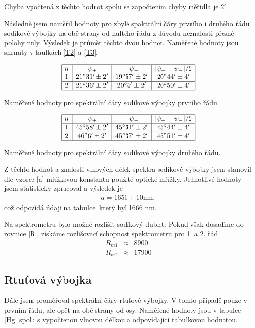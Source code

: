 \documentclass[a4paper,12pt]{article}
\begin{document}
Chyba vpočtená z těchto hodnot spolu se započtením chyby měřidla je $2'$.

Následně jsem naměřil hodnoty pro zbylé spaktrální čáry prvního i druhého řádu sodíkové výbojky na obě strany od nultého řádu z důvodu 
neznalosti přesné polohy nuly. Výsledek je průměr těchto dvou hodnot. Naměřené hodnoty jsou shrnuty v taulkách \ref{T2} a \ref{T3}.

\begin{table}
$$
\begin{array}{|c|c|c|c|}
\hline
n&  \psi_+& -\psi_-& |\psi_+-\psi_-|/2 \\ \hline
1&  21^{\circ} 31'\pm 2'&  19^{\circ} 57'\pm 2'&  20^{\circ} 44'\pm 4' \\ \hline
2&  21^{\circ} 36'\pm 2'& 20^{\circ} 4'\pm 2'& 20^{\circ} 50'\pm 4' \\ \hline
\end{array}
$$
\caption{Naměřené hodnoty pro spektrální čáry sodíkové výbojky prvního řádu.}
\label{T2}
\end{table}

\begin{table}
$$
\begin{array}{|c|c|c|c|}
\hline
n&  \psi_+& -\psi_-& |\psi_+-\psi_-|/2 \\ \hline
1&  45^{\circ} 58'\pm 2'&  45^{\circ} 31'\pm 2'&  45^{\circ} 44'\pm 4'\\ \hline
2&  46^{\circ} 6'\pm 2'& 45^{\circ} 37'\pm 2'& 45^{\circ} 51'\pm 4' \\ \hline
\end{array}
$$
\caption{Naměřené hodnoty pro spektrální čáry sodíkové výbojky druhého řádu.}
\label{T3}
\end{table}

Z těchto hodnot a znalosti vlnových délek spektra sodíkové výbojky jsem stanovil dle vzorce \ref{a} mřížkovou konstantu použíté optické mřížky.
Jednotlivé hodnoty jsem statisticky zpracoval a výsledek je
\begin{eqnarray}
a=1650\pm10 \mbox{nm},
\end{eqnarray}
což odpovídá údaji na tabulce, který byl 1666 nm.

Na spektrometru bylo možné rozlišit sodíkový dublet. Pokud však dosadíme do rovnice \ref{R}, získáme rozlišovací schopnost spektrometru pro 1. a 2. řád
\begin{eqnarray}
R_{m1}&\approx&8900 \\
R_{m2}&\approx&17900
\end{eqnarray}

\subsection{Rtuťová výbojka}
Dále jsem proměřoval spektrální čáry rtuťové výbojky. V tomto případě pouze v prvním řádu, ale opět na obě strany od osy. Naměřené hodnoty jsou 
v tabulce \ref{Hg} spolu s vypočtenou vlnovou délkou a odpovídající tabulkovou hodnotou.
\end{document}
